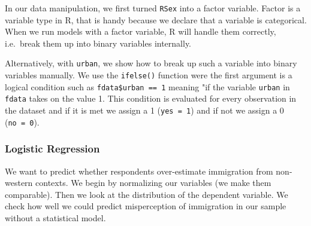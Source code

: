 \documentclass[]{article}
\newenvironment{Shaded}{\begin{snugshade}}{\end{snugshade}}
\newcommand{\DataTypeTok}[1]{\textcolor[rgb]{0.13,0.29,0.53}{#1}}
\newcommand{\DecValTok}[1]{\textcolor[rgb]{0.00,0.00,0.81}{#1}}
\newcommand{\KeywordTok}[1]{\textcolor[rgb]{0.13,0.29,0.53}{\textbf{#1}}}
\newcommand{\NormalTok}[1]{#1}
\newcommand{\OperatorTok}[1]{\textcolor[rgb]{0.81,0.36,0.00}{\textbf{#1}}}
\newcommand{\StringTok}[1]{\textcolor[rgb]{0.31,0.60,0.02}{#1}}
\begin{document}
\begin{Shaded}
\end{Shaded}

In our data manipulation, we first turned \texttt{RSex} into a factor variable. Factor is a variable type in R, that is handy because we declare that a variable is categorical. When we run models with a factor variable, R will handle them correctly, i.e.~break them up into binary variables internally.

Alternatively, with \texttt{urban}, we show how to break up such a variable into binary variables manually. We use the \texttt{ifelse()} function were the first argument is a logical condition such as \texttt{fdata\$urban\ ==\ 1} meaning "if the variable \texttt{urban} in \texttt{fdata} takes on the value 1. This condition is evaluated for every observation in the dataset and if it is met we assign a 1 (\texttt{yes\ =\ 1}) and if not we assign a 0 (\texttt{no\ =\ 0}).

\hypertarget{logistic-regression}{%
\subsubsection{Logistic Regression}\label{logistic-regression}}

We want to predict whether respondents over-estimate immigration from non-western contexts. We begin by normalizing our variables (we make them comparable). Then we look at the distribution of the dependent variable. We check how well we could predict misperception of immigration in our sample without a statistical model.
\end{document}
